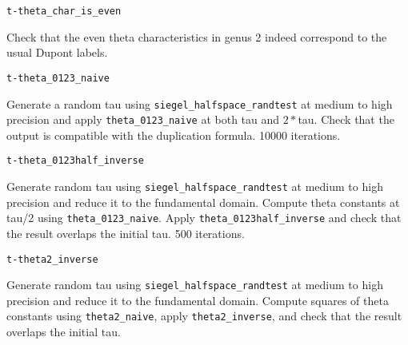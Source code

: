 \documentclass{article}
\newcommand{\code}[1]{\lstinline:#1:}
\newcommand{\fun}[1]{\vspace{2mm}\noindent \code{#1}}
\begin{document}
\fun{t-theta_char_is_even}

Check that the even theta characteristics in genus 2 indeed correspond
to the usual Dupont labels.

\fun{t-theta_0123_naive}

Generate a random tau using \code{siegel_halfspace_randtest} at medium
to high precision and apply \code{theta_0123_naive} at both tau and
$2*$tau. Check that the output is compatible with the duplication
formula. 10000 iterations.

\fun{t-theta_0123half_inverse}

Generate random tau using \code{siegel_halfspace_randtest} at medium
to high precision and reduce it to the fundamental domain. Compute
theta constants at tau/2 using \code{theta_0123_naive}. Apply
\code{theta_0123half_inverse} and check that the result overlaps the
initial tau. 500 iterations.

\fun{t-theta2_inverse}

Generate random tau using \code{siegel_halfspace_randtest} at medium
to high precision and reduce it to the fundamental domain. Compute
squares of theta constants using \code{theta2_naive}, apply
\code{theta2_inverse}, and check that the result overlaps the initial
tau. 
\end{document}
